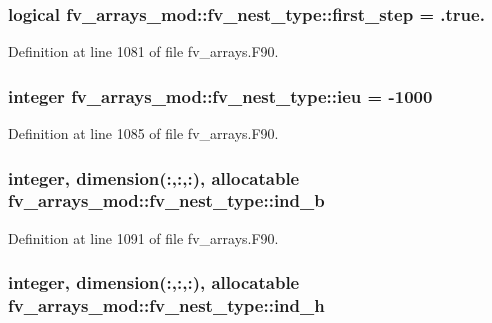 \subsubsection[{first\-\_\-step}]{\setlength{\rightskip}{0pt plus 5cm}logical fv\-\_\-arrays\-\_\-mod\-::fv\-\_\-nest\-\_\-type\-::first\-\_\-step = .true.}\label{structfv__arrays__mod_1_1fv__nest__type_a751315043662ab03c036c2e8f35ed3e3}


Definition at line 1081 of file fv\-\_\-arrays.\-F90.

\subsubsection[{ieu}]{\setlength{\rightskip}{0pt plus 5cm}integer fv\-\_\-arrays\-\_\-mod\-::fv\-\_\-nest\-\_\-type\-::ieu = -\/1000}\label{structfv__arrays__mod_1_1fv__nest__type_abf7c9c0bc141c25e6780cfb7fdf2c61a}


Definition at line 1085 of file fv\-\_\-arrays.\-F90.

\subsubsection[{ind\-\_\-b}]{\setlength{\rightskip}{0pt plus 5cm}integer, dimension(\-:,\-:,\-:), allocatable fv\-\_\-arrays\-\_\-mod\-::fv\-\_\-nest\-\_\-type\-::ind\-\_\-b}\label{structfv__arrays__mod_1_1fv__nest__type_ac3a7fc6c7539c84371aabdf03358423d}


Definition at line 1091 of file fv\-\_\-arrays.\-F90.

\subsubsection[{ind\-\_\-h}]{\setlength{\rightskip}{0pt plus 5cm}integer, dimension(\-:,\-:,\-:), allocatable fv\-\_\-arrays\-\_\-mod\-::fv\-\_\-nest\-\_\-type\-::ind\-\_\-h}\label{structfv__arrays__mod_1_1fv__nest__type_aca2c6b35886f7d7de3d0f1b37c0bef1e}


